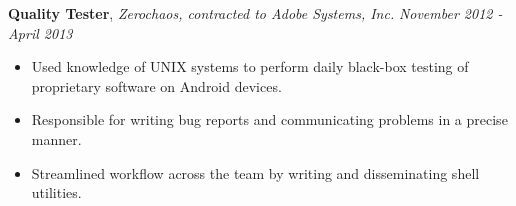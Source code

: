 \documentclass[10pt]{article}
\newenvironment{changemargin}[2]{%
  \begin{list}{}{%
    \setlength{\topsep}{0pt}%
    \setlength{\leftmargin}{#1}%
    \setlength{\rightmargin}{#2}%
    \setlength{\listparindent}{\parindent}%
    \setlength{\itemindent}{\parindent}%
    \setlength{\parsep}{\parskip}%
  }%
  \item[]}{\end{list}
}
\newenvironment{body} {
	\vspace*{-16pt}
	\begin{changemargin}{-0.25in}{-0.5in}
  }	
	{\end{changemargin}
}
\begin{document}
\begin{body}
	
	
	\textbf{Quality Tester}, \emph{Zerochaos, contracted to Adobe Systems, Inc.} \hfill \emph{November 2012 - April 2013}\\
	\vspace*{-4pt}
	\begin{itemize} \itemsep -0pt  %
		\item Used knowledge of UNIX systems to perform daily black-box testing of proprietary software on Android devices.
		\item Responsible for writing bug reports and communicating problems in a precise manner.
		\item Streamlined workflow across the team by writing and disseminating shell utilities.
	\end{itemize}
\begin{comment}
	\textbf{Senior Counselor}, \emph{Milton Collins Day Camp} \hfill \emph{Summer 2012}\\
	\vspace*{-4pt}
	\begin{itemize} \itemsep -0pt  %
		\item Responsible for groups of 2nd-6th graders and for creating a safe, spirited, and fun experience. 
		\item Worked with supervisors and fellow staff in ensuring management of children, supplies, and instruction.
		\item Helped lead camp-wide multi-day event, radically different from day-to-day activities. %
	\end{itemize}
\end{comment}


\end{body}
\end{document}
